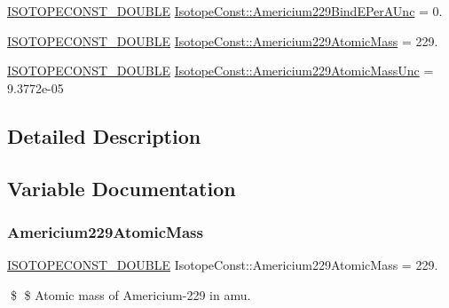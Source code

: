 \begin{DoxyCompactItemize}
\mbox{\hyperlink{group___isotope_const-_macros_ga8f45a7272ce02c0b4c65c44636ed719a}{I\+S\+O\+T\+O\+P\+E\+C\+O\+N\+S\+T\+\_\+\+D\+O\+U\+B\+LE}} \mbox{\hyperlink{group___isotope_const-_americium-_am229_gab0da4db046d8cb01a2a2d88f7bc1cfe8}{Isotope\+Const\+::\+Americium229\+Bind\+E\+Per\+A\+Unc}} = 0.
\item 
\mbox{\hyperlink{group___isotope_const-_macros_ga8f45a7272ce02c0b4c65c44636ed719a}{I\+S\+O\+T\+O\+P\+E\+C\+O\+N\+S\+T\+\_\+\+D\+O\+U\+B\+LE}} \mbox{\hyperlink{group___isotope_const-_americium-_am229_gadd43bd676c7283968f4de780504e9408}{Isotope\+Const\+::\+Americium229\+Atomic\+Mass}} = 229.
\item 
\mbox{\hyperlink{group___isotope_const-_macros_ga8f45a7272ce02c0b4c65c44636ed719a}{I\+S\+O\+T\+O\+P\+E\+C\+O\+N\+S\+T\+\_\+\+D\+O\+U\+B\+LE}} \mbox{\hyperlink{group___isotope_const-_americium-_am229_ga3b7f1d4a3ca09cd9789c7023f71fea3c}{Isotope\+Const\+::\+Americium229\+Atomic\+Mass\+Unc}} = 9.\+3772e-\/05
\end{DoxyCompactItemize}


\subsection{Detailed Description}


\subsection{Variable Documentation}
\mbox{\label{group___isotope_const-_americium-_am229_gadd43bd676c7283968f4de780504e9408}} 
\subsubsection{\texorpdfstring{Americium229\+Atomic\+Mass}{Americium229AtomicMass}}
{\footnotesize\ttfamily \mbox{\hyperlink{group___isotope_const-_macros_ga8f45a7272ce02c0b4c65c44636ed719a}{I\+S\+O\+T\+O\+P\+E\+C\+O\+N\+S\+T\+\_\+\+D\+O\+U\+B\+LE}} Isotope\+Const\+::\+Americium229\+Atomic\+Mass = 229.}

\$ \$ Atomic mass of Americium-\/229 in amu. \mbox{\label{group___isotope_const-_americium-_am229_ga3b7f1d4a3ca09cd9789c7023f71fea3c}} 
